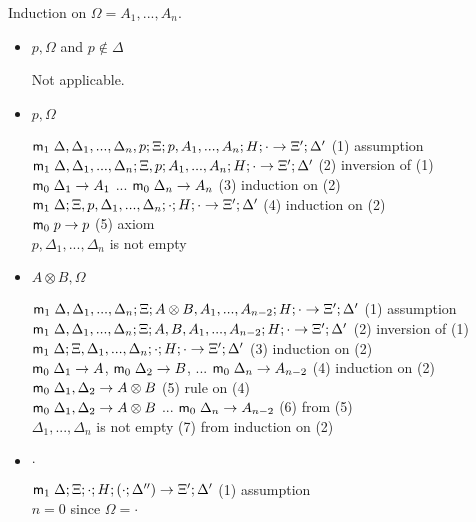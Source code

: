 Induction on $\Omega = A_1, ..., A_n$.

\begin{itemize}
\item $p, \Omega$ and $p \notin \Delta$

Not applicable.

\item $p, \Omega$

$\mathsf{m}_1 \; \Delta, \Delta_1, ..., \Delta_n, p; \Xi; p, A_1, ..., A_n; H; \cdot \rightarrow \Xi'; \Delta'$ \hfill (1) assumption \\
$\mathsf{m}_1 \; \Delta, \Delta_1, ..., \Delta_n; \Xi, p; A_1, ..., A_n; H; \cdot \rightarrow \Xi'; \Delta'$ \hfill (2) inversion of (1) \\
$\mathsf{m}_0 \; \Delta_1 \rightarrow A_1$ ... $\mathsf{m}_0 \; \Delta_n \rightarrow A_n$ \hfill (3) induction on (2) \\
$\mathsf{m}_1 \; \Delta; \Xi, p, \Delta_1, ..., \Delta_n; \cdot ; H ; \cdot \rightarrow \Xi'; \Delta'$ \hfill (4) induction on (2) \\
$\mathsf{m}_0 \; p \rightarrow p$ \hfill (5) axiom \\
$p, \Delta_1, ..., \Delta_n$ is not empty\\

\item $A \otimes B, \Omega$

$\mathsf{m}_1 \; \Delta, \Delta_1, ..., \Delta_n; \Xi; A \otimes B, A_1, ..., A_{n-2}; H; \cdot \rightarrow \Xi'; \Delta'$ \hfill (1) assumption \\
$\mathsf{m}_1 \; \Delta, \Delta_1, ..., \Delta_n; \Xi; A, B, A_1, ..., A_{n-2}; H; \cdot \rightarrow \Xi'; \Delta'$ \hfill (2) inversion of (1) \\
$\mathsf{m}_1 \; \Delta; \Xi, \Delta_1, ..., \Delta_n; \cdot ; H; \cdot \rightarrow \Xi'; \Delta'$ \hfill (3) induction on (2) \\
$\mathsf{m}_0 \; \Delta_1 \rightarrow A$, \; $\mathsf{m}_0 \; \Delta_2 \rightarrow B$, \; ... \; $\mathsf{m}_0 \; \Delta_n \rightarrow A_{n-2}$ \hfill (4) induction on (2) \\
$\mathsf{m}_0 \; \Delta_1, \Delta_2 \rightarrow A \otimes B$ \hfill (5) rule on (4) \\
$\mathsf{m}_0 \; \Delta_1, \Delta_2 \rightarrow A \otimes B$ \; ... \; $\mathsf{m}_0 \; \Delta_n \rightarrow A_{n-2}$ \hfill (6) from (5) \\
$\Delta_1, ..., \Delta_n$ is not empty \hfill (7) from induction on (2) \\

\item $\cdot$

$\mathsf{m}_1 \; \Delta ; \Xi; \cdot ; H; (\cdot ; \Delta'') \rightarrow \Xi'; \Delta'$ \hfill (1) assumption \\
$n = 0$ \hfill since $\Omega = \cdot$ \\

\end{itemize}

